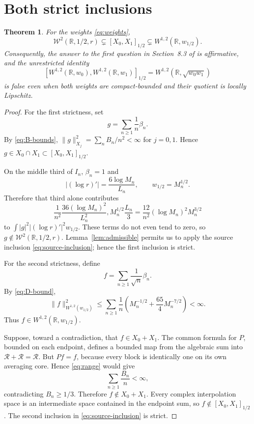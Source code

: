 \documentclass[11pt]{article}
\newtheorem{theorem}{Theorem}
\theoremstyle{remark}
\newcommand{\R}{\mathbb R}
\newcommand{\Waux}{\mathcal W}
\begin{document}
\section{Both strict inclusions}

\begin{theorem}\label{thm:main}
For the weights \eqref{eq:weights},
\[
 \Waux^2(\R,1/2,r)
 \subsetneq [X_0,X_1]_{1/2}
 \subsetneq W^{1,2}(\R,w_{1/2}).
\]
Consequently, the answer to the first question in Section~8.3 of
\cite{CE} is affirmative, and the unrestricted identity
\[
 [W^{1,2}(\R,w_0),W^{1,2}(\R,w_1)]_{1/2}
 =W^{1,2}(\R,\sqrt{w_0w_1})
\]
is false even when both weights are compact-bounded and their quotient is
locally Lipschitz.
\end{theorem}

\begin{proof}
For the first strictness, set
\[
 g=\sum_{n\geq1}\frac1n\beta_n.
\]
By \eqref{eq:B-bounds},
$\|g\|_{X_j}^2=\sum_nB_n/n^2<\infty$ for $j=0,1$.  Hence
$g\in X_0\cap X_1\subset[X_0,X_1]_{1/2}$.

On the middle third of $I_n$, $\beta_n=1$ and
\[
 |(\log r)'|=\frac{6\log M_n}{L_n},\qquad
 w_{1/2}=M_n^{1/2}.
\]
Therefore that third alone contributes
\begin{equation}\label{eq:aux-divergence}
 \frac1{n^2}\frac{36(\log M_n)^2}{L_n^2},
 M_n^{1/2}\frac{L_n}{3}
 =\frac{12}{n^2}(\log M_n)^2M_n^{3/2}
\end{equation}
to
$\int |g|^2|(\log r)'|^2w_{1/2}$.  These terms do not even tend to zero, so
$g\notin\Waux^2(\R,1/2,r)$.  Lemma~\ref{lem:admissible} permits us to apply
the source inclusion \eqref{eq:source-inclusion}; hence the first inclusion is
strict.

For the second strictness, define
\[
 f=\sum_{n\geq1}\frac1{\sqrt n}\beta_n.
\]
By \eqref{eq:D-bound},
\[
 \|f\|_{W^{1,2}(w_{1/2})}^2
 \leq\sum_{n\geq1}\frac1n
 \left(M_n^{-1/2}+\frac{65}{4}M_n^{-7/2}\right)<\infty.
\]
Thus $f\in W^{1,2}(\R,w_{1/2})$.

Suppose, toward a contradiction, that $f\in X_0+X_1$.  The common formula
for $P$, bounded on each endpoint, defines a bounded map from the algebraic
sum into $\mathcal R+\mathcal R=\mathcal R$.  But $Pf=f$, because every block
is identically one on its own averaging core.  Hence \eqref{eq:range} would
give
\[
 \sum_{n\geq1}\frac{B_n}{n}<\infty,
\]
contradicting $B_n\geq1/3$.  Therefore $f\notin X_0+X_1$.  Every complex
interpolation space is an intermediate space contained in the endpoint sum,
so $f\notin[X_0,X_1]_{1/2}$.  The second inclusion in
\eqref{eq:source-inclusion} is strict.
\end{proof}
\end{document}
